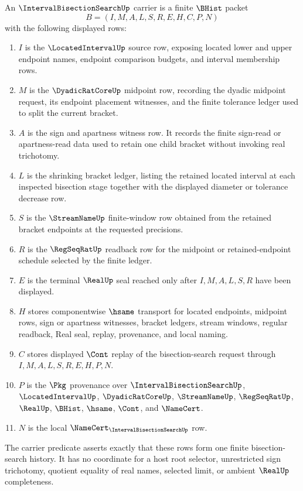 \begin{definition}
\label{def:interval-bisection-search-carrier}
An $\IntervalBisectionSearchUp$ carrier is a finite $\BHist$ packet
$$
B=(I,M,A,L,S,R,E,H,C,P,N)
$$
with the following displayed rows:
\begin{enumerate}
\item $I$ is the $\LocatedIntervalUp$ source row, exposing located lower and upper endpoint names, endpoint comparison budgets, and interval membership rows.
\item $M$ is the $\DyadicRatCoreUp$ midpoint row, recording the dyadic midpoint request, its endpoint placement witnesses, and the finite tolerance ledger used to split the current bracket.
\item $A$ is the sign and apartness witness row. It records the finite sign-read or apartness-read data used to retain one child bracket without invoking real trichotomy.
\item $L$ is the shrinking bracket ledger, listing the retained located interval at each inspected bisection stage together with the displayed diameter or tolerance decrease row.
\item $S$ is the $\StreamNameUp$ finite-window row obtained from the retained bracket endpoints at the requested precisions.
\item $R$ is the $\RegSeqRatUp$ readback row for the midpoint or retained-endpoint schedule selected by the finite ledger.
\item $E$ is the terminal $\RealUp$ seal reached only after $I,M,A,L,S,R$ have been displayed.
\item $H$ stores componentwise $\hsame$ transport for located endpoints, midpoint rows, sign or apartness witnesses, bracket ledgers, stream windows, regular readback, Real seal, replay, provenance, and local naming.
\item $C$ stores displayed $\Cont$ replay of the bisection-search request through $I,M,A,L,S,R,E,H,P,N$.
\item $P$ is the $\Pkg$ provenance over $\IntervalBisectionSearchUp$, $\LocatedIntervalUp$, $\DyadicRatCoreUp$, $\StreamNameUp$, $\RegSeqRatUp$, $\RealUp$, $\BHist$, $\hsame$, $\Cont$, and $\NameCert$.
\item $N$ is the local $\NameCert_{\IntervalBisectionSearchUp}$ row.
\end{enumerate}
The carrier predicate asserts exactly that these rows form one finite bisection-search history. It has no coordinate for a host root selector, unrestricted sign trichotomy, quotient equality of real names, selected limit, or ambient $\RealUp$ completeness.
\end{definition}

